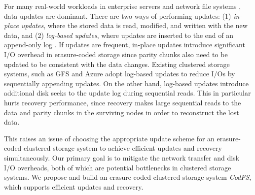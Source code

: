 For many real-world workloads in enterprise servers and network file systems
\cite{adams12,narayanan08}, data updates are dominant.  There are two ways of
performing updates: (1) {\em in-place updates}, where the stored data is read,
modified, and written with the new data, and (2) {\em log-based updates},
where updates are inserted to the end of an append-only log
\cite{rosenblum92}.  If updates are frequent, in-place updates introduce
significant I/O overhead in erasure-coded storage since parity chunks also
need to be updated to be consistent with the data changes.  Existing
clustered storage systems, such as GFS \cite{ghemawat03} and Azure 
\cite{calder11} adopt log-based updates to reduce \mbox{I/Os} by sequentially
appending updates.  On the other hand, log-based updates introduce additional
disk seeks to the update log during sequential reads.  This in particular
hurts recovery performance, since recovery makes large sequential reads to the
data and parity chunks in the surviving nodes in order to reconstruct the lost
data. 

This raises an issue of choosing the appropriate update scheme for an
erasure-coded clustered storage system to achieve efficient updates and
recovery simultaneously.  Our primary goal is to mitigate the network transfer
and disk I/O overheads, both of which are potential bottlenecks in clustered
storage systems. 
We propose and build an erasure-coded clustered storage system {\em CodFS}, 
which supports efficient updates and recovery. 



